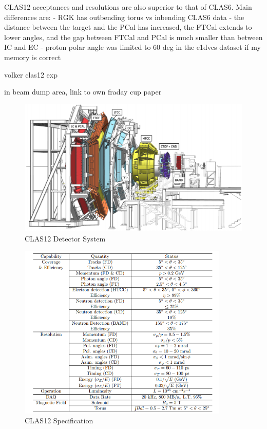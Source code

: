 
CLAS12 acceptances and resolutions are also superior to that of CLAS6. Main differences are:
- RGK has outbending torus vs inbending CLAS6 data
- the distance between the target and the PCal has increased, the FTCal extends to lower angles, and the gap between FTCal and PCal is much smaller than between IC and EC
- proton polar angle was limited to 60 deg in the e1dvcs dataset if my memory is correct


    volker clas12 exp \cite{Burkert2020TheLaboratory}


    in beam dump area, link to own fraday cup paper \cite{Johnston2019RealizationElectrons}
    \begin{figure}[H]
        \centering
        \includegraphics[width=12cm]{Chapters/Ch2-Experiment/clas-12-exp/clas-detectors/other/pics/CLA12.png}
        \caption{ CLAS12 Detector System }
    \end{figure}
    
    \begin{figure}[H]
        \centering
        \includegraphics[width=10cm]{Chapters/Ch2-Experiment/clas-12-exp/clas-detectors/other/pics/clas12-params.png}
        \caption{CLAS12 Specification}
    \end{figure}

